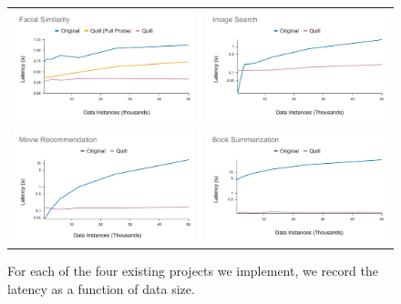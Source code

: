 \documentclass[11pt]{article}
\begin{document}
\begin{figure}[ht]
  \begin{tabular}{cc}
    \includegraphics[width=0.5\linewidth]{figs/openface_latency_large.pdf} & \includegraphics[width=0.5\linewidth]{figs/imagesearch_latency_large.pdf} \\
    \includegraphics[width=0.5\linewidth]{figs/movie_latency_large.pdf}  & \includegraphics[width=0.5\linewidth]{figs/booksummarization_latency_large.pdf} \\ 
  \end{tabular}
  \caption{For each of the four existing projects we implement, we record the latency as a function of data size.}
  \label{fig:latencies}
\end{figure}
\end{document}
